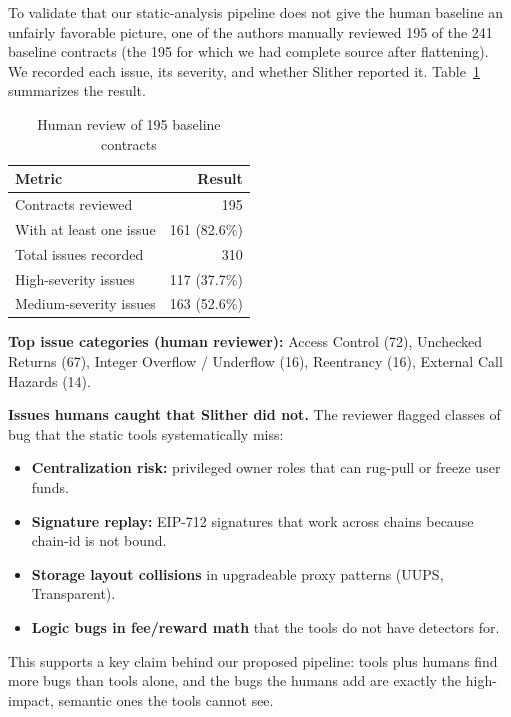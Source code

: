 \documentclass[11pt]{article}
\begin{document}
To validate that our static-analysis pipeline does not give the human baseline an unfairly favorable picture, one of the authors manually reviewed 195 of the 241 baseline contracts (the 195 for which we had complete source after flattening). We recorded each issue, its severity, and whether Slither reported it. Table~\ref{tab:human_review} summarizes the result.

\begin{table}[H]
\centering
\caption{Human review of 195 baseline contracts}
\label{tab:human_review}
\begin{tabular}{@{}lr@{}}
\toprule
\textbf{Metric} & \textbf{Result} \\
\midrule
Contracts reviewed              & 195 \\
With at least one issue         & 161 (82.6\%) \\
Total issues recorded           & 310 \\
High-severity issues            & 117 (37.7\%) \\
Medium-severity issues          & 163 (52.6\%) \\
\bottomrule
\end{tabular}
\end{table}

\textbf{Top issue categories (human reviewer):} Access Control (72), Unchecked Returns (67), Integer Overflow / Underflow (16), Reentrancy (16), External Call Hazards (14).

\textbf{Issues humans caught that Slither did not.} The reviewer flagged classes of bug that the static tools systematically miss:
\begin{itemize}[leftmargin=*]
    \item \textbf{Centralization risk:} privileged owner roles that can rug-pull or freeze user funds.
    \item \textbf{Signature replay:} EIP-712 signatures that work across chains because chain-id is not bound.
    \item \textbf{Storage layout collisions} in upgradeable proxy patterns (UUPS, Transparent).
    \item \textbf{Logic bugs in fee/reward math} that the tools do not have detectors for.
\end{itemize}

This supports a key claim behind our proposed pipeline: tools plus humans find more bugs than tools alone, and the bugs the humans add are exactly the high-impact, semantic ones the tools cannot see.
\end{document}

